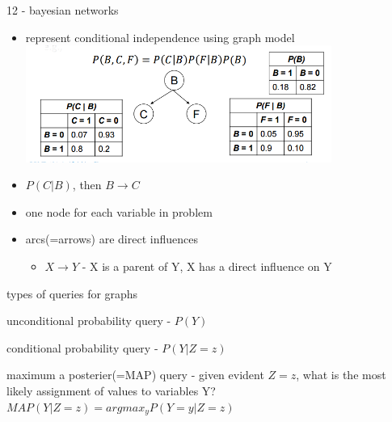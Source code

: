 \documentclass[11pt]{article}
\newcommand{\ee}[1]{\ensuremath{#1}}
\begin{document}
\begin{description}
\item 12 - bayesian networks
\begin{itemize}
	\item represent conditional independence using graph model
	\\ \includegraphics[width=100mm,scale=1]{bayes_net}
	\item \ee{P(C \vert B)}, then \ee{B \rightarrow C}
	\item one node for each variable in problem
	\item arcs(=arrows) are direct influences
	\begin{itemize}
		\item \ee{X \rightarrow Y} - X is a parent of Y, X has a direct influence on Y
	\end{itemize}
\end{itemize}

\item types of queries for graphs
\begin{description}
	\item unconditional probability query - \ee{P(Y)}
	\item conditional probability query - \ee{P(Y|Z = z)}
	\item maximum a posterier(=MAP) query - given evident \ee{Z = z}, what is the most likely assignment of values to variables Y? \\ \ee{MAP(Y|Z = z) = argmax_yP(Y=y|Z=z)}
\end{description}

\end{description}
\end{document}
